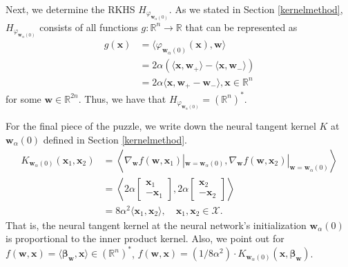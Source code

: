 \documentclass{article}
\begin{document}
Next, we determine the RKHS $H_{\varphi_{\boldsymbol{w}_{\alpha}(0)}}$. As we stated in Section \ref{kernelmethod}, $H_{\varphi_{\boldsymbol{w}_{\alpha}(0)}}$ consists of all functions $g: \mathbb{R}^n \rightarrow \mathbb{R}$ that can be represented as 
\begin{align*}
    g(\boldsymbol{x}) &= \langle \varphi_{\boldsymbol{w}_{\alpha}(0)}(\boldsymbol{x}), \boldsymbol{w} \rangle\\
    &= 2\alpha (\langle \boldsymbol{x}, \boldsymbol{w}_+ \rangle  - \langle \boldsymbol{x}, \boldsymbol{w}_-\rangle)\\
    &= 2\alpha \langle \boldsymbol{x}, \boldsymbol{w}_+ - \boldsymbol{w}_- \rangle, \boldsymbol{x} \in \mathbb{R}^n
\end{align*}
for some $\boldsymbol{w} \in \mathbb{R}^{2n}$. Thus, we have that $H_{\varphi_{\boldsymbol{w}_{\alpha}(0)}} = (\mathbb{R}^n)^*$.

For the final piece of the puzzle, we write down the neural tangent kernel $K$ at $\boldsymbol{w}_{\alpha}(0)$ defined in Section \ref{kernelmethod}.
\begin{align*}
K_{\boldsymbol{w}_{\alpha}(0)}(\boldsymbol{x}_1, \boldsymbol{x}_2) &= \left\langle \nabla_{\boldsymbol{w}}f(\boldsymbol{w}, \boldsymbol{x}_1)|_{\boldsymbol{w} = \boldsymbol{w}_{\alpha}(0)}, \nabla_{\boldsymbol{w}}f(\boldsymbol{w}, \boldsymbol{x}_2)|_{\boldsymbol{w} = \boldsymbol{w}_{\alpha}(0)} \right\rangle\\
&= \left\langle 2\alpha 
    \begin{bmatrix}
        \boldsymbol{x}_1\\
        -\boldsymbol{x}_1
    \end{bmatrix}, 2\alpha 
    \begin{bmatrix}
        \boldsymbol{x}_2\\
        -\boldsymbol{x}_2
    \end{bmatrix} \right\rangle\\
&= 8\alpha^2 \langle \boldsymbol{x}_1, \boldsymbol{x}_2 \rangle, \quad \boldsymbol{x}_1, \boldsymbol{x}_2 \in \mathcal{X}.
\end{align*}
That is, the neural tangent kernel at the neural network's initialization $\boldsymbol{w}_{\alpha}(0)$ is proportional to the inner product kernel. Also, we point out for $f(\boldsymbol{w}, \boldsymbol{x}) = \langle \boldsymbol{\beta}_{\boldsymbol{w}}, \boldsymbol{x} \rangle \in (\mathbb{R}^n)^*$, $f(\boldsymbol{w}, \boldsymbol{x}) = (1/8\alpha^2)\cdot K_{\boldsymbol{w}_{\alpha}(0)}(\boldsymbol{x},\boldsymbol{\beta}_{\boldsymbol{w}})$.
\end{document}
